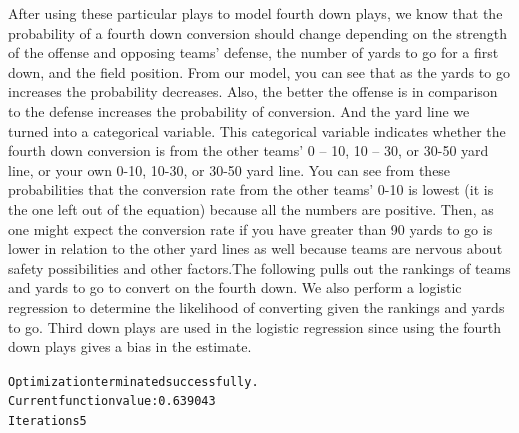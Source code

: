 \documentclass[letterpaper,10pt,english]{/anaconda/lib/python2.7/site-packages/sphinx/texinputs/sphinxhowto}
\newenvironment{InvisibleVerbatim}
        {\begin{mdframed}[leftmargin=0.1\linewidth,innerleftmargin=3pt,innerrightmargin=3pt, userdefinedwidth=1\linewidth, linewidth=0pt, linecolor=white, usetwoside=false]}
        {\end{mdframed}}
\begin{document}
After using these particular plays to model fourth down plays, we know
that the probability of a fourth down conversion should change depending
on the strength of the offense and opposing teams' defense, the number
of yards to go for a first down, and the field position. From our model,
you can see that as the yards to go increases the probability decreases.
Also, the better the offense is in comparison to the defense increases
the probability of conversion. And the yard line we turned into a
categorical variable. This categorical variable indicates whether the
fourth down conversion is from the other teams' 0 -- 10, 10 -- 30, or
30-50 yard line, or your own 0-10, 10-30, or 30-50 yard line. You can
see from these probabilities that the conversion rate from the other
teams' 0-10 is lowest (it is the one left out of the equation) because
all the numbers are positive. Then, as one might expect the conversion
rate if you have greater than 90 yards to go is lower in relation to the
other yard lines as well because teams are nervous about safety
possibilities and other factors.The following pulls out the rankings of teams and yards to go to convert
on the fourth down. We also perform a logistic regression to determine
the likelihood of converting given the rankings and yards to go. Third
down plays are used in the logistic regression since using the fourth
down plays gives a bias in the estimate.

    

        
        

            
                \begin{InvisibleVerbatim}
                \vspace{-0.5\baselineskip}
\begin{alltt}Optimization terminated successfully.
         Current function value: 0.639043
         Iterations 5
\end{alltt}

            \end{InvisibleVerbatim}
            
\end{document}
